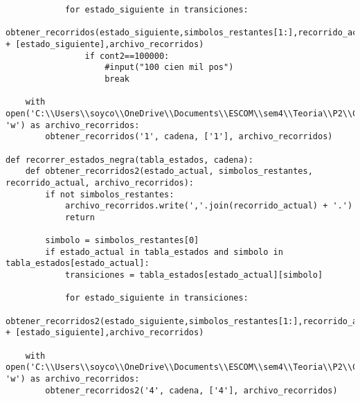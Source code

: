 \begin{enumerate}
\begin{lstlisting}
            for estado_siguiente in transiciones:
                obtener_recorridos(estado_siguiente,simbolos_restantes[1:],recorrido_actual + [estado_siguiente],archivo_recorridos)
                if cont2==100000:
                    #input("100 cien mil pos")
                    break

    with open('C:\\Users\\soyco\\OneDrive\\Documents\\ESCOM\\sem4\\Teoria\\P2\\Chess\\output\\recorridos_blanca.txt', 'w') as archivo_recorridos:
        obtener_recorridos('1', cadena, ['1'], archivo_recorridos)

def recorrer_estados_negra(tabla_estados, cadena):
    def obtener_recorridos2(estado_actual, simbolos_restantes, recorrido_actual, archivo_recorridos):
        if not simbolos_restantes:
            archivo_recorridos.write(','.join(recorrido_actual) + '.')
            return

        simbolo = simbolos_restantes[0]
        if estado_actual in tabla_estados and simbolo in tabla_estados[estado_actual]:
            transiciones = tabla_estados[estado_actual][simbolo]

            for estado_siguiente in transiciones:
                obtener_recorridos2(estado_siguiente,simbolos_restantes[1:],recorrido_actual + [estado_siguiente],archivo_recorridos)

    with open('C:\\Users\\soyco\\OneDrive\\Documents\\ESCOM\\sem4\\Teoria\\P2\\Chess\\output\\recorridos_negra.txt', 'w') as archivo_recorridos:
        obtener_recorridos2('4', cadena, ['4'], archivo_recorridos)


\end{lstlisting}
\end{enumerate}
